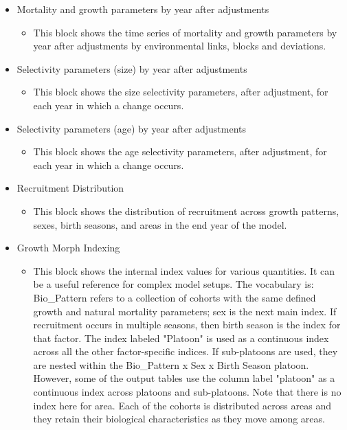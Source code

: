 \begin{itemize}
	\item Mortality and growth parameters by year after adjustments
	\begin{itemize}
		\item This block shows the time series of mortality and growth parameters by year after adjustments by environmental links, blocks and deviations.
	\end{itemize}
	\item Selectivity parameters (size) by year after adjustments
	\begin{itemize}
		\item This block shows the size selectivity parameters, after adjustment, for each year in which a change occurs.
	\end{itemize}
	\item Selectivity parameters (age) by year after adjustments
	\begin{itemize}
		\item This block shows the age selectivity parameters, after adjustment, for each year in which a change occurs.
	\end{itemize}
	\item Recruitment Distribution
	\begin{itemize}
		\item This block shows the distribution of recruitment across growth patterns, sexes, birth seasons, and areas in the end year of the model.
	\end{itemize}
	\item Growth Morph Indexing
	\begin{itemize}
		\item This block shows the internal index values for various quantities.  It can be a useful reference for complex model setups. The vocabulary is: Bio\_Pattern refers to a collection of cohorts with the same defined growth and natural mortality parameters; sex is the next main index. If recruitment occurs in multiple seasons, then birth season is the index for that factor. The index labeled "Platoon" is used as a continuous index across all the other factor-specific indices. If sub-platoons are used, they are nested within the Bio\_Pattern x Sex x Birth Season platoon. However, some of the output tables use the column label "platoon" as a continuous index across platoons and sub-platoons. Note that there is no index here for area. Each of the cohorts is distributed across areas and they retain their biological characteristics as they move among areas.

\end{itemize}
\end{itemize}
